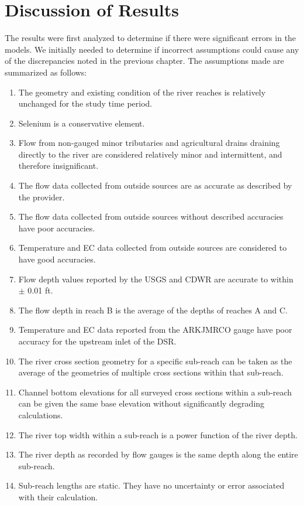 \renewcommand{\thechapter}{6}
\chapter{Discussion of Results}
\label{c-analysis}
\begin{linenumbers}[1]
The results were first analyzed to determine if there were significant errors in the models.  We initially needed to determine if incorrect assumptions could cause any of the discrepancies noted in the previous chapter.  The assumptions made are summarized as follows:
\begin{enumerate}
\item The geometry and existing condition of the river reaches is relatively unchanged for the study time period.
\item Selenium is a conservative element.
\item Flow from non-gauged minor tributaries and agricultural drains draining directly to the river are considered relatively minor and intermittent, and therefore insignificant.
\item The flow data collected from outside sources are as accurate as described by the provider.
\item The flow data collected from outside sources without described accuracies have poor accuracies.
\item Temperature and EC data collected from outside sources are considered to have good accuracies.
\item Flow depth values reported by the USGS and CDWR are accurate to within $\pm$ 0.01 ft.
\item The flow depth in reach B is the average of the depths of reaches A and C.
\item Temperature and EC data reported from the ARKJMRCO gauge have poor accuracy for the upstream inlet of the DSR.
\item The river cross section geometry for a specific sub-reach can be taken as the average of the geometries of multiple cross sections within that sub-reach.
\item Channel bottom elevations for all surveyed cross sections within a sub-reach can be given the same base elevation without significantly degrading calculations.
\item The river top width within a sub-reach is a power function of the river depth.
\item The river depth as recorded by flow gauges is the same depth along the entire sub-reach.
\item Sub-reach lengths are static.  They have no uncertainty or error associated with their calculation.

\end{enumerate}
\end{linenumbers}
